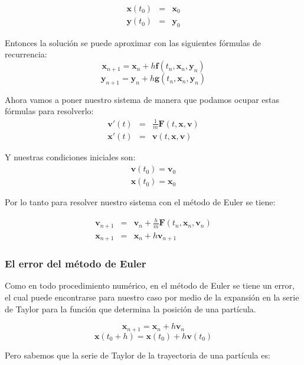 \begin{eqnarray}
\textbf{x}(t_0) & = & \textbf{x}_0 \nonumber \\
\textbf{y}(t_0) & = & \textbf{y}_0
\label{condiciones:general}
\end{eqnarray}

Entonces la solución se puede aproximar con las siguientes fórmulas de recurrencia:
$$\textbf{x}_{n+1} = \textbf{x}_n + h\textbf{f}(t_n, \textbf{x}_n, \textbf{y}_n)$$
$$\textbf{y}_{n+1} = \textbf{y}_n + h\textbf{g}(t_n, \textbf{x}_n, \textbf{y}_n)$$

Ahora vamos a poner nuestro sistema de manera que podamos ocupar estas fórmulas para resolverlo:
\begin{eqnarray}
\textbf{v}'(t) & = & \frac{1}{m}\textbf{F}(t, \textbf{x}, \textbf{v}) \nonumber \\
\textbf{x}'(t) & = & \textbf{v}(t, \textbf{x}, \textbf{v})
\label{sistema:particular}
\end{eqnarray}

Y nuestras condiciones iniciales son:
\begin{eqnarray}
\textbf{v}(t_0) = \textbf{v}_0 \nonumber \\
\textbf{x}(t_0) = \textbf{x}_0
\label{condiciones:particular}
\end{eqnarray}

Por lo tanto para resolver nuestro sistema con el método de Euler se tiene:

\begin{eqnarray}
\textbf{v}_{n+1} & = & \textbf{v}_n + \frac{h}{m}\textbf{F}(t_n, \textbf{x}_n, \textbf{v}_n)\nonumber \\
\textbf{x}_{n+1} & = & \textbf{x}_n + h\textbf{v}_{n + 1}
\label{formulas:Euler}
\end{eqnarray}

\subsubsection{El error del método de Euler}
Como en todo procedimiento numérico, en el método de Euler se tiene un error, el cual puede encontrarse para nuestro caso por medio de la expansión en la serie de 
Taylor para la función que determina la posición de una partícula.

$$\textbf{x}_{n+1}  =  \textbf{x}_n + h\textbf{v}_n$$
$$\textbf{x}(t_0 + h) = \textbf{x}(t_0) + h \textbf{v}(t_0)$$

Pero sabemos que la serie de Taylor de la trayectoria de una partícula es:

